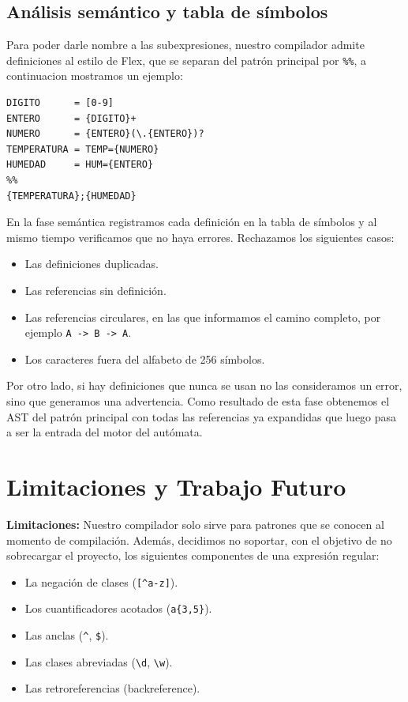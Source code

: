 \documentclass[runningheads]{llncs}
\begin{document}
\subsection{Análisis semántico y tabla de símbolos}\label{sec:semantica}
Para poder darle nombre a las subexpresiones, nuestro compilador admite definiciones al estilo de Flex, que se separan del patrón principal por \texttt{\%\%}, a continuacion mostramos un ejemplo:
\begin{lstlisting}[basicstyle=\ttfamily\scriptsize, frame=tb, columns=fullflexible]
DIGITO      = [0-9]
ENTERO      = {DIGITO}+
NUMERO      = {ENTERO}(\.{ENTERO})?
TEMPERATURA = TEMP={NUMERO}
HUMEDAD     = HUM={ENTERO}
%%
{TEMPERATURA};{HUMEDAD}
\end{lstlisting}
En la fase semántica registramos cada definición en la tabla de símbolos y al mismo tiempo verificamos que no haya errores. Rechazamos los siguientes casos:
\begin{itemize}
  \item Las definiciones duplicadas.
  \item Las referencias sin definición.
  \item Las referencias circulares, en las que informamos el camino completo, por ejemplo \texttt{A -> B -> A}.
  \item Los caracteres fuera del alfabeto de 256 símbolos.
  \end{itemize}
Por otro lado, si hay definiciones que nunca se usan no las consideramos un error, sino que generamos una advertencia. Como resultado de esta fase obtenemos el AST del patrón principal con todas las referencias ya expandidas que luego pasa a ser la entrada del motor del autómata.

\section{Limitaciones y Trabajo Futuro}
 \textbf{Limitaciones:} Nuestro compilador solo sirve para patrones que se conocen al momento de compilación. Además, decidimos no soportar, con el objetivo de no sobrecargar el proyecto, los siguientes componentes de una expresión regular:
 \begin{itemize}
  \item La negación de clases (\verb|[^a-z]|).
  \item Los cuantificadores acotados (\verb|a{3,5}|).
  \item Las anclas (\verb|^|, \verb|$|).
  \item Las clases abreviadas (\verb|\d|, \verb|\w|).
  \item Las retroreferencias (backreference).
\end{itemize}
\end{document}
